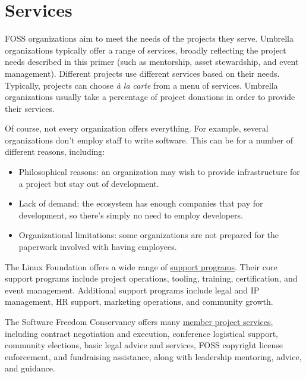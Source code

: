 


\chapter{Services}

FOSS organizations aim to meet the needs of the projects they serve.  Umbrella organizations typically offer a range of services, broadly reflecting the project needs described in this primer (such as mentorship, asset stewardship, and event management).  Different projects use different services based on their needs.  Typically, projects can choose \textit{à la carte} from a menu of services.  Umbrella organizations usually take a percentage of project donations in order to provide their services.

Of course, not every organization offers everything.  For example, several organizations don't employ staff to write software.  This can be for a number of different reasons, including:

\begin{itemize}

\itemsep 0.50em

\item Philosophical reasons: an organization may wish to provide infrastructure for a project but stay out of development.
\item Lack of demand: the ecosystem has enough companies that pay for development, so there's simply no need to employ developers.
\item Organizational limitations: some organizations are not prepared for the paperwork involved with having employees.

\end{itemize}

\begin{kaobox}[frametitle=Example services and support programs]

The Linux Foundation offers a wide range of \href{https://www.linuxfoundation.org/en/projects/support-programs/}{support programs}.  Their core support programs include project operations, tooling, training, certification, and event management.  Additional support programs include legal and IP management, HR support, marketing operations, and community growth.

The Software Freedom Conservancy offers many \href{https://sfconservancy.org/projects/services/}{member project services}, including contract negotiation and execution, conference logistical support, community elections, basic legal advice and services, FOSS copyright license enforcement, and fundraising assistance, along with leadership mentoring, advice, and guidance.


\end{kaobox}

